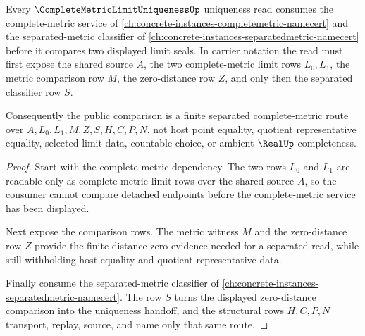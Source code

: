 \begin{theorem}
\label{thm:complete-metric-limit-uniqueness-separated-metric-dependency-route}
Every $\CompleteMetricLimitUniquenessUp$ uniqueness read consumes the complete-metric service of \autoref{ch:concrete-instances-completemetric-namecert} and the separated-metric classifier of \autoref{ch:concrete-instances-separatedmetric-namecert} before it compares two displayed limit seals. In carrier notation the read must first expose the shared source $A$, the two complete-metric limit rows $L_{0},L_{1}$, the metric comparison row $M$, the zero-distance row $Z$, and only then the separated classifier row $S$.

Consequently the public comparison is a finite separated complete-metric route over $A,L_{0},L_{1},M,Z,S,H,C,P,N$, not host point equality, quotient representative equality, selected-limit data, countable choice, or ambient $\RealUp$ completeness.
\end{theorem}
\begin{proof}
Start with the complete-metric dependency. The two rows $L_{0}$ and $L_{1}$ are readable only as complete-metric limit rows over the shared source $A$, so the consumer cannot compare detached endpoints before the complete-metric service has been displayed.

Next expose the comparison rows. The metric witness $M$ and the zero-distance row $Z$ provide the finite distance-zero evidence needed for a separated read, while still withholding host equality and quotient representative data.

Finally consume the separated-metric classifier of \autoref{ch:concrete-instances-separatedmetric-namecert}. The row $S$ turns the displayed zero-distance comparison into the uniqueness handoff, and the structural rows $H,C,P,N$ transport, replay, source, and name only that same route.
\end{proof}
